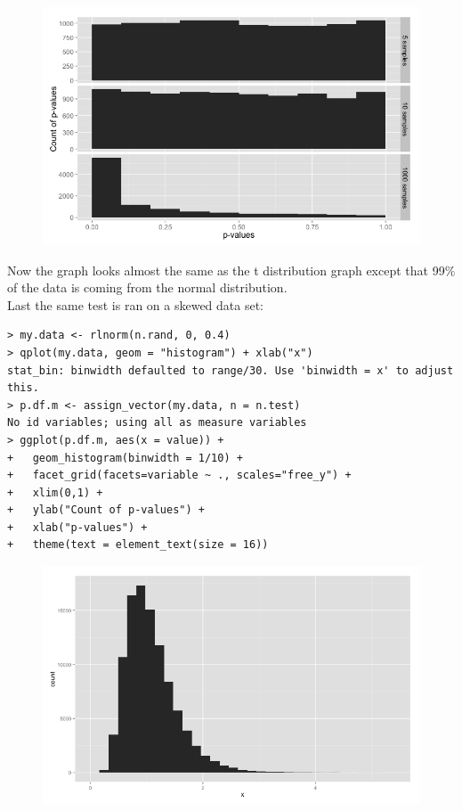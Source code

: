 \documentclass[10pt]{article}
\begin{document}
\begin{figure}[!h]
\includegraphics[scale=0.37]{nDistTtails.png}
\centering
\end{figure}
Now the graph looks almost the same as the t distribution graph except that 99\% of the data is coming from the normal distribution.\\
Last the same test is ran on a skewed data set:
\begin{verbatim}
> my.data <- rlnorm(n.rand, 0, 0.4)
> qplot(my.data, geom = "histogram") + xlab("x")
stat_bin: binwidth defaulted to range/30. Use 'binwidth = x' to adjust this.
> p.df.m <- assign_vector(my.data, n = n.test)
No id variables; using all as measure variables
> ggplot(p.df.m, aes(x = value)) + 
+   geom_histogram(binwidth = 1/10) + 
+   facet_grid(facets=variable ~ ., scales="free_y") + 
+   xlim(0,1) +
+   ylab("Count of p-values") +
+   xlab("p-values") +
+   theme(text = element_text(size = 16))
\end{verbatim}
\begin{figure}[!h]
\includegraphics[scale=0.37]{histPlotSkew.png}
\centering
\end{figure}
\end{document}
